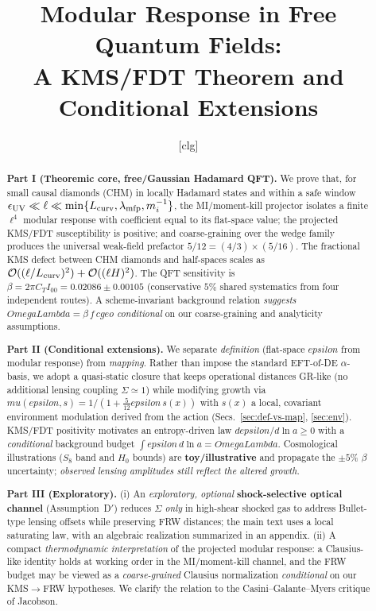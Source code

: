 \documentclass[aps,prd,onecolumn,superscriptaddress,nofootinbib]{revtex4-2}
\def\OmL{OmegaLambda}%
\def\cgeo{cgeo}%
\def\eps{epsilon}%
\def\mu{mu}%
\def\alpha{alpha}%
\def\alpha_M{alphaM}%
\def\Omega_\Lambda{OmegaLambda}%
\providecommand{\OmL}{\Omega_\Lambda}
\providecommand{\cgeo}{c_{\rm geo}}
\providecommand{\eps}{\varepsilon}
\begin{document}
\title{Modular Response in Free Quantum Fields:\\
A KMS/FDT Theorem and Conditional Extensions}

\author{[clg]}
\affiliation{[Institutions]}
\date{}

\begin{abstract}
\textbf{Part I (Theoremic core, free/Gaussian Hadamard QFT).} We prove that, for small causal diamonds (CHM) in locally Hadamard states and within a safe window \(\epsilon_{\rm UV}\ll\ell\ll \min\{L_{\rm curv},\lambda_{\rm mfp},m_i^{-1}\}\), the MI/moment-kill projector isolates a finite \(\ell^4\) modular response with coefficient equal to its flat-space value; the projected KMS/FDT susceptibility is positive; and coarse-graining over the wedge family produces the universal weak-field prefactor \(5/12=(4/3)\times(5/16)\). The fractional KMS defect between CHM diamonds and half-spaces scales as \(\mathcal O((\ell/L_{\rm curv})^2)+\mathcal O((\ell H)^2)\). The QFT sensitivity is \(\beta=2\pi C_T I_{00}=0.02086\pm 0.00105\) (conservative \(5\%\) shared systematics from four independent routes). A scheme-invariant background relation \emph{suggests} \(\OmL=\beta\, f\,\cgeo\) \emph{conditional} on our coarse-graining and analyticity assumptions.

\smallskip
\textbf{Part II (Conditional extensions).} We separate \emph{definition} (flat-space \(\eps\) from modular response) from \emph{mapping}. Rather than impose the standard EFT-of-DE \(\alpha\)-basis, we adopt a quasi-static closure that keeps operational distances GR-like (no additional lensing coupling \(\Sigma\simeq 1\)) while modifying growth via \(\mu(\eps,s)=1/(1+\tfrac{5}{12}\eps\,s(x))\) with \(s(x)\) a local, covariant environment modulation derived from the action (Secs.~\ref{sec:def-vs-map}, \ref{sec:env}). KMS/FDT positivity motivates an entropy-driven law \(d\eps/d\ln a\ge 0\) with a \emph{conditional} background budget \(\int \eps\,d\ln a=\OmL\). Cosmological illustrations (\(S_8\) band and \(H_0\) bounds) are \textbf{toy/illustrative} and propagate the \(\pm5\%\) \(\beta\) uncertainty; \emph{observed lensing amplitudes still reflect the altered growth}.

\smallskip
\textbf{Part III (Exploratory).} (i) An \emph{exploratory, optional} \textbf{shock-selective optical channel} (Assumption~D$'$) reduces \(\Sigma\) \emph{only} in high-shear shocked gas to address Bullet-type lensing offsets while preserving FRW distances; the main text uses a local saturating law, with an algebraic realization summarized in an appendix. (ii) A compact \emph{thermodynamic interpretation} of the projected modular response: a Clausius-like identity holds at working order in the MI/moment-kill channel, and the FRW budget may be viewed as a \emph{coarse-grained} Clausius normalization \emph{conditional} on our KMS\(\to\)FRW hypotheses. We clarify the relation to the Casini--Galante--Myers critique of Jacobson.


\end{abstract}
\end{document}
